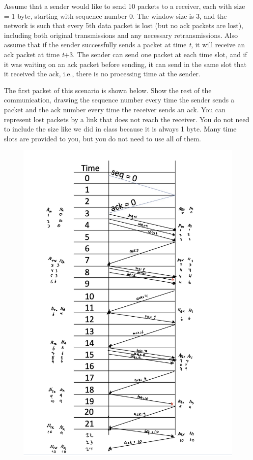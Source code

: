 \documentclass[10pt]{article}
\newenvironment{problem}[2][Problem]{\begin{trivlist}
\item[\hskip \labelsep {\bfseries #1}\hskip \labelsep {\bfseries #2.}]}{\end{trivlist}}
\begin{document}
\begin{problem}{3: Sliding Window Protocol}
Assume that a sender would like to send 10 packets to a receiver, each with size = 1 byte, starting with sequence number 0. The window size is 3, and the network is such that every 5th data packet is lost (but no ack packets are lost), including both original transmissions and any necessary retransmissions. Also assume that if the sender successfully sends a packet at time \emph{t}, it will receive an ack packet at time \emph{t}+3. The sender can send one packet at each time slot, and if it was waiting on an ack packet before sending, it can send in the same slot that it received the ack, i.e., there is no processing time at the sender. 

The first packet of this scenario is shown below. Show the rest of the communication, drawing the sequence number every time the sender sends a packet and the ack number every time the receiver sends an ack. You can represent lost packets by a link that does not reach the receiver. You do not need to include the size like we did in class because it is always 1 byte. Many time slots are provided to you, but you do not need to use all of them. 

\begin{figure}[h!]
    \centering
    \includegraphics[scale = 0.25]{hw7pr3.jpeg}
\end{figure}

\end{problem}
\end{document}
